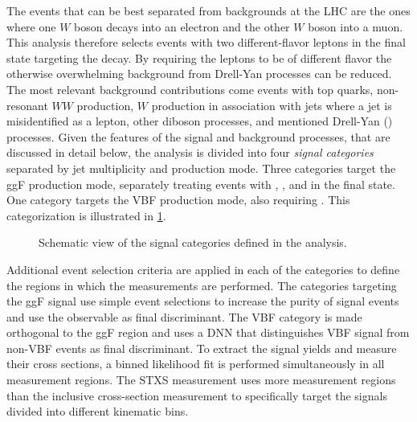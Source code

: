 The \HWW events that can be best separated from backgrounds at the LHC are the ones where one $W$ boson decays into an electron and the other $W$ boson into a muon.
This analysis therefore selects events with two different-flavor leptons in the final state targeting the \HWWdet decay.
By requiring the leptons to be of different flavor the otherwise overwhelming background from Drell-Yan processes can be reduced. 
The most relevant background contributions come events with top quarks, non-resonant $WW$ production, $W$ production in association with jets where a jet is misidentified as a lepton, other diboson processes, and mentioned Drell-Yan (\Zgamma) processes.
Given the features of the signal and background processes, that are discussed in detail below, the analysis is divided into four \emph{signal categories} separated by jet multiplicity and production mode.
Three categories target the ggF production mode, separately treating events with \ZeroJet, \OneJet, and \TwoJet in the final state. One category targets the VBF production mode, also requiring \TwoJet. 
This categorization is illustrated in \cref{fig:signal-categorization}. 
\begin{figure}
    \caption{Schematic view of the signal categories defined in the \HWW analysis.}
    \label{fig:signal-categorization}
\end{figure}
Additional event selection criteria are applied in each of the categories to define the regions in which the measurements are performed.
The categories targeting the ggF signal use simple event selections to increase the purity of signal events and use the \mT observable as final discriminant. 
The VBF \TwoJet category is made orthogonal to the ggF \TwoJet region and uses a DNN that distinguishes VBF signal from non-VBF events as final discriminant.
To extract the signal yields and measure their cross sections, a binned likelihood fit is performed simultaneously in all measurement regions. 
The STXS measurement uses more measurement regions than the inclusive cross-section measurement to specifically target the signals divided into different kinematic bins. 


